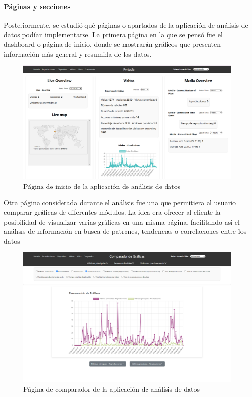 \paragraph{Páginas y secciones}
Posteriormente, se estudió qué páginas o apartados de la aplicación de análisis de datos podían implementarse. La primera página en la 
que se pensó fue el dashboard o página de inicio, donde se mostrarán gráficos que presenten información más general y resumida de los datos.


\begin{figure}[H]
    \centering
    \includegraphics[width=0.8  \textwidth]{imaxes/dashboard.png}
    \caption{Página de inicio de la aplicación de análisis de datos}
    \label{fig:dashboard}
\end{figure}

Otra página considerada durante el análisis fue una que permitiera al usuario comparar gráficas de diferentes módulos. La idea 
era ofrecer al cliente la posibilidad de visualizar varias gráficas en una misma página, facilitando así el análisis de información 
en busca de patrones, tendencias o correlaciones entre los datos.

\begin{figure}[H]
    \centering
    \includegraphics[width=0.8  \textwidth]{imaxes/comparador.png}
    \caption{Página de comparador de la aplicación de análisis de datos}
    \label{fig:comparador}
\end{figure}

